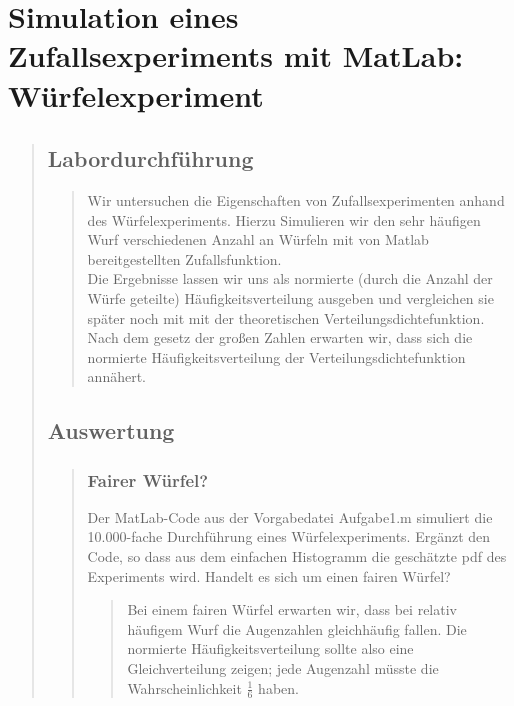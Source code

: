 \section{Simulation eines Zufallsexperiments mit MatLab: Würfelexperiment}
\begin{quote}
    
    
    \subsection{Labordurchführung}
    \begin{quote}
        
        Wir untersuchen die Eigenschaften von Zufallsexperimenten anhand des Würfelexperiments.
        Hierzu Simulieren wir den sehr häufigen Wurf verschiedenen Anzahl an Würfeln mit von Matlab bereitgestellten
        Zufallsfunktion.\\
        Die Ergebnisse lassen wir uns als normierte (durch die Anzahl der Würfe geteilte) Häufigkeitsverteilung ausgeben und
        vergleichen sie später noch mit mit der theoretischen Verteilungsdichtefunktion.\\
        Nach dem gesetz der großen Zahlen erwarten wir, dass sich die normierte Häufigkeitsverteilung der
        Verteilungsdichtefunktion annähert.
        
    \end{quote}
    
    
    
    
    
    \subsection{Auswertung}
    \begin{quote}
        
        \subsubsection{Fairer Würfel?}
        Der MatLab-Code aus der Vorgabedatei Aufgabe1.m simuliert die 10.000-fache Durchführung eines Würfelexperiments. Ergänzt
        den Code, so dass aus dem einfachen Histogramm die geschätzte pdf des Experiments wird. Handelt es sich um einen fairen
        Würfel?
        
        \begin{quote}
        
            
            Bei einem fairen Würfel erwarten wir, dass bei relativ häufigem Wurf die Augenzahlen gleichhäufig fallen. Die
            normierte Häufigkeitsverteilung sollte also eine Gleichverteilung zeigen; jede Augenzahl müsste die Wahrscheinlichkeit
            $\frac{1}{6}$ haben.\\
            

\end{quote}
\end{quote}
\end{quote}
